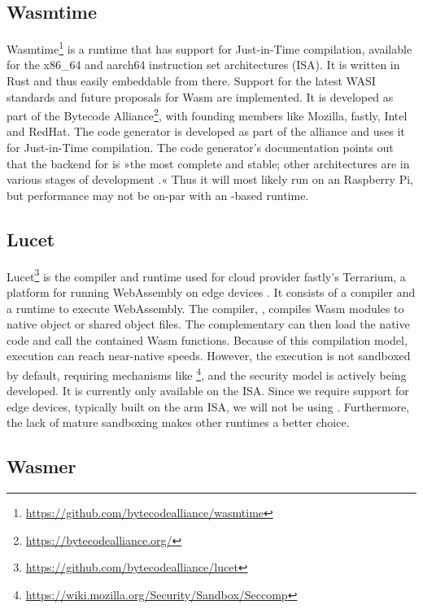 \subsection{Wasmtime}

Wasmtime\footnote{\url{https://github.com/bytecodealliance/wasmtime}} is a runtime that has support for Just-in-Time compilation, available for the x86\_64 and aarch64 instruction set architectures (ISA). It is written in Rust and thus easily embeddable from there. Support for the latest WASI standards and future proposals for Wasm are implemented.
It is developed as part of the Bytecode Alliance\footnote{\url{https://bytecodealliance.org/}}, with founding members like Mozilla, fastly, Intel and RedHat. The  code generator is developed as part of the alliance and  uses it for Just-in-Time compilation. The code generator's documentation points out that the backend for  is »the most complete and stable; other architectures are in various stages of development \cite{Alliance2021}.« 
Thus it will most likely run on an  Raspberry Pi, but performance may not be on-par with an -based runtime.

\subsection{Lucet}

Lucet\footnote{\url{https://github.com/bytecodealliance/lucet}} is the compiler and runtime used for cloud provider fastly's Terrarium, a platform for running WebAssembly on edge devices \cite{fastly2019}. It consists of a compiler and a runtime to execute WebAssembly. The compiler, , compiles Wasm modules to native object or shared object files. The complementary  can then load the native code and call the contained Wasm functions. Because of this compilation model, execution can reach near-native speeds. However, the execution is not sandboxed by default, requiring mechanisms like \footnote{\url{https://wiki.mozilla.org/Security/Sandbox/Seccomp}}, and the security model is actively being developed. It is currently only available on the  ISA. Since we require support for edge devices, typically built on the arm ISA, we will not be using . Furthermore, the lack of mature sandboxing makes other runtimes a better choice.

\subsection{Wasmer}

